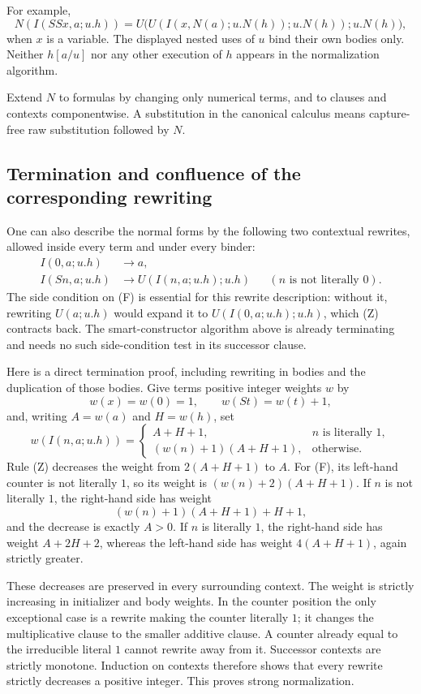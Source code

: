 For example,
\[
 N(I(SSx,a;u.h))
 =U\bigl(U(I(x,N(a);u.N(h));u.N(h));u.N(h)\bigr),
\]
when $x$ is a variable.  The displayed nested uses of $u$ bind their own
bodies only.  Neither $h[a/u]$ nor any other execution of $h$ appears in
the normalization algorithm.

Extend $N$ to formulas by changing only numerical terms, and to clauses
and contexts componentwise.  A substitution in the canonical calculus
means capture-free raw substitution followed by $N$.

\subsection{Termination and confluence of the corresponding rewriting}

One can also describe the normal forms by the following two contextual
rewrites, allowed inside every term and under every binder:
\begin{align*}
 I(0,a;u.h)&\longrightarrow a, \tag{Z}\\
 I(Sn,a;u.h)&\longrightarrow U(I(n,a;u.h);u.h)
       &&(n\text{ is not literally }0). \tag{F}
\end{align*}
The side condition on (F) is essential for this rewrite description:
without it, rewriting $U(a;u.h)$ would expand it to
$U(I(0,a;u.h);u.h)$, which (Z) contracts back.  The smart-constructor
algorithm above is already terminating and needs no such side-condition
test in its successor clause.

Here is a direct termination proof, including rewriting in bodies and
the duplication of those bodies.  Give terms positive integer weights
$w$ by
\[
 w(x)=w(0)=1,\qquad w(St)=w(t)+1,
\]
and, writing $A=w(a)$ and $H=w(h)$, set
\[
 w(I(n,a;u.h))=
 \begin{cases}
 A+H+1,&n\text{ is literally }1,\\
 (w(n)+1)(A+H+1),&\text{otherwise}.
 \end{cases}
\]
Rule (Z) decreases the weight from $2(A+H+1)$ to $A$.
For (F), its left-hand counter is not literally $1$, so its weight is
$(w(n)+2)(A+H+1)$.  If $n$ is not literally $1$, the right-hand side
has weight
\[
 (w(n)+1)(A+H+1)+H+1,
\]
and the decrease is exactly $A>0$.  If $n$ is literally $1$, the
right-hand side has weight $A+2H+2$, whereas the left-hand side has
weight $4(A+H+1)$, again strictly greater.

These decreases are preserved in every surrounding context.  The
weight is strictly increasing in initializer and body weights.  In the
counter position the only exceptional case is a rewrite making the
counter literally $1$; it changes the multiplicative clause to the
smaller additive clause.  A counter already equal to the irreducible
literal $1$ cannot rewrite away from it.  Successor contexts are
strictly monotone.  Induction on contexts therefore shows that every
rewrite strictly decreases a positive integer.  This proves strong
normalization.

